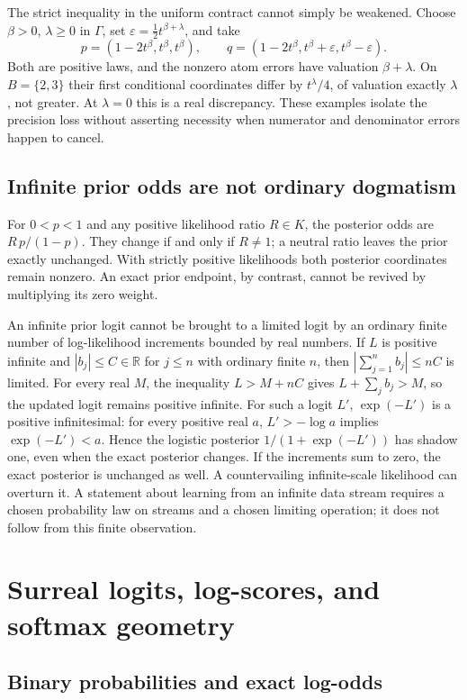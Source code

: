 \documentclass[11pt,a4paper]{article}
\numberwithin{equation}{section}
\theoremstyle{definition}
\theoremstyle{remark}
\newcommand{\R}{\mathbb R}
\newcommand{\eps}{\varepsilon}
\begin{document}
The strict inequality in the uniform contract cannot simply be weakened.
Choose $\beta>0$, $\lambda\ge0$ in $\Gamma$, set
$\eps=\tfrac12t^{\beta+\lambda}$, and take
\[
 p=(1-2t^\beta,t^\beta,t^\beta),\qquad
 q=(1-2t^\beta,t^\beta+\eps,t^\beta-\eps).
\]
Both are positive laws, and the nonzero atom errors have valuation
$\beta+\lambda$. On $B=\{2,3\}$ their first conditional coordinates
differ by $t^\lambda/4$, of valuation exactly $\lambda$, not greater.
At $\lambda=0$ this is a real discrepancy. These examples isolate the
precision loss without asserting necessity when numerator and denominator
errors happen to cancel.

\subsection{Infinite prior odds are not ordinary dogmatism}

For $0<p<1$ and any positive likelihood ratio $R\in K$,
the posterior odds are $R\,p/(1-p)$. They change if and only if $R\ne1$;
a neutral ratio leaves the prior exactly unchanged. With strictly positive
likelihoods both posterior coordinates remain nonzero. An exact prior
endpoint, by contrast, cannot be revived by multiplying its zero weight.

An infinite prior logit cannot be brought to a limited logit by an
ordinary finite number of log-likelihood increments bounded by real numbers.
If $L$ is positive infinite and $|b_j|\le C\in\R$ for $j\le n$ with
ordinary finite $n$, then $|\sum_{j=1}^n b_j|\le nC$ is limited.
For every real $M$, the inequality $L>M+nC$ gives
$L+\sum_jb_j>M$, so the updated logit remains positive infinite.
For such a logit $L'$, $\exp(-L')$ is a positive infinitesimal:
for every positive real $a$, $L'>-\log a$ implies $\exp(-L')<a$.
Hence the logistic posterior $1/(1+\exp(-L'))$ has shadow one,
even when the exact posterior changes. If the increments sum to zero,
the exact posterior is unchanged as well.
A countervailing infinite-scale likelihood can overturn it. A statement
about learning from an infinite data stream requires a chosen probability
law on streams and a chosen limiting operation; it does not follow from
this finite observation.

\section{Surreal logits, log-scores, and softmax geometry}
\label{fsp:sec:logits}

\subsection{Binary probabilities and exact log-odds}
\end{document}
